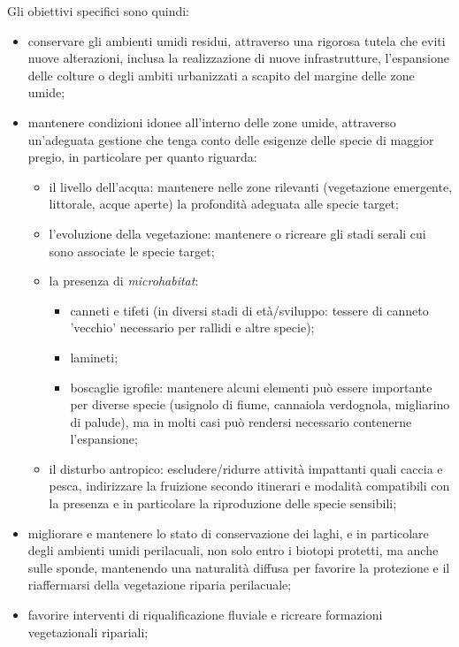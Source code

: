 \documentclass[10pt,twoside,openany,x11names,svgnames,italian,a5paper,dvipsnames,table]{memoir}
\begin{document}
Gli obiettivi specifici sono quindi:
\begin{itemize}\itemsep0pt
  \item conservare gli ambienti umidi residui, attraverso una rigorosa tutela che eviti nuove alterazioni, inclusa la realizzazione di nuove infrastrutture, l'espansione delle colture o degli ambiti urbanizzati a scapito del margine delle zone umide;
  \item mantenere condizioni idonee all'interno delle zone umide, attraverso un'adeguata gestione che tenga conto delle esigenze delle specie di maggior pregio, in particolare per quanto riguarda:
    \begin{itemize}\itemsep0pt
      \item il livello dell'acqua: mantenere nelle zone rilevanti (vegetazione emergente, littorale, acque aperte) la profondità adeguata alle specie target;
      \item l'evoluzione della vegetazione: mantenere o ricreare gli stadi serali cui sono associate le specie target;
      \item la presenza di \emph{microhabitat}:
        \begin{itemize}\itemsep0pt
          \item canneti e tifeti (in diversi stadi di età/sviluppo: tessere di canneto 'vecchio' necessario per rallidi e altre specie);
          \item lamineti;
          \item boscaglie igrofile: mantenere alcuni elementi può essere importante per diverse specie (usignolo di fiume, cannaiola verdognola, migliarino di palude), ma in molti casi può rendersi necessario contenerne l'espansione;
        \end{itemize}
      \item il disturbo antropico: escludere/ridurre attività impattanti quali caccia e pesca, indirizzare la fruizione secondo itinerari e modalità compatibili con la presenza e in particolare la riproduzione delle specie sensibili;
    \end{itemize}
  \item migliorare e mantenere lo stato di conservazione dei laghi, e in particolare degli ambienti umidi perilacuali, non solo entro i biotopi protetti, ma anche sulle sponde, mantenendo una naturalità diffusa per favorire la protezione e il riaffermarsi della vegetazione riparia perilacuale; 
  \item favorire interventi di riqualificazione fluviale e ricreare formazioni vegetazionali ripariali;

\end{itemize}
\end{document}
